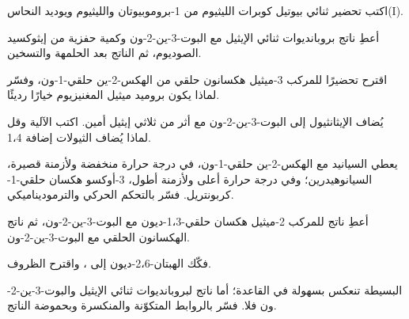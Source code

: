 \begin{exercise}[$\star$]\label{exo:b2:conjugate-additions:3}
اكتب تحضير ثنائي بيوتيل كوبرات الليثيوم من 1-بروموبيوتان والليثيوم ويوديد النحاس(I).
\end{exercise}

\begin{exercise}[$\star$]\label{exo:b2:conjugate-additions:4}
أعطِ ناتج بروبانديوات ثنائي الإيثيل مع البوت-3-ين-2-ون وكمية حفزية من إيثوكسيد
الصوديوم، ثم الناتج بعد الحلمهة والتسخين.
\end{exercise}

\begin{exercise}[$\star\star$]\label{exo:b2:conjugate-additions:5}
اقترح تحضيرًا للمركب 3-ميثيل هكسانون حلقي من الهكس-2-ين حلقي-1-ون، وفسّر لماذا يكون
بروميد ميثيل المغنيزيوم خيارًا رديئًا.
\end{exercise}

\begin{exercise}[$\star\star$]\label{exo:b2:conjugate-additions:6}
يُضاف الإيثانثيول إلى البوت-3-ين-2-ون مع أثر من ثلاثي إيثيل أمين. اكتب الآلية وقل لماذا
يُضاف الثيولات إضافة 1،4.
\end{exercise}

\begin{exercise}[$\star\star$]\label{exo:b2:conjugate-additions:7}
يعطي السيانيد مع الهكس-2-ين حلقي-1-ون، في درجة حرارة منخفضة ولأزمنة قصيرة، السيانوهيدرين؛ وفي درجة حرارة
أعلى ولأزمنة أطول، 3-أوكسو هكسان حلقي-1-كربونتريل. فسّر بالتحكم الحركي والترموديناميكي.
\end{exercise}

\begin{exercise}[$\star\star$]\label{exo:b2:conjugate-additions:8}
أعطِ ناتج  للمركب 2-ميثيل هكسان حلقي-1،3-ديون مع البوت-3-ين-2-ون، ثم ناتج
الهكسانون الحلقي مع البوت-3-ين-2-ون.
\end{exercise}

\begin{exercise}[$\star\star$]\label{exo:b2:conjugate-additions:9}
فكّك الهبتان-2،6-ديون إلى  ، واقترح الظروف.
\end{exercise}

\begin{exercise}[$\star\star\star$]\label{exo:b2:conjugate-additions:10}
 البسيطة تنعكس بسهولة في القاعدة؛ أما ناتج  لبروبانديوات ثنائي الإيثيل 
والبوت-3-ين-2-ون فلا. فسّر بالروابط المتكوّنة والمنكسرة وبحموضة الناتج.
\end{exercise}


